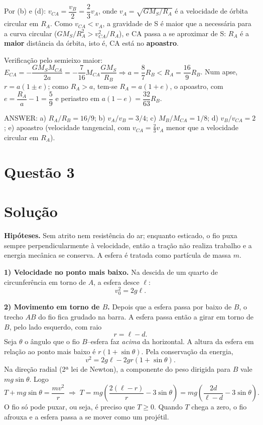 \documentclass{article}%
\begin{document}
Por (b) e (d): $v_{CA}=\dfrac{v_B}{2}=\dfrac{2}{3}v_A$, onde $v_A=\sqrt{GM_S/R_A}$ é a velocidade de órbita circular em $R_A$. Como $v_{CA}<v_A$, a gravidade de S é maior que a necessária para a curva circular ($GM_S/R_A^2>v_{CA}^2/R_A$), e CA passa a se aproximar de S: $R_A$ é a \textbf{maior} distância da órbita, isto é, CA está no \textbf{apoastro}.

Verificação pelo semieixo maior: $E_{CA}=-\dfrac{GM_SM_{CA}}{2a}=-\dfrac{7}{16}M_{CA}\dfrac{GM_S}{R_B}\Rightarrow a=\dfrac{8}{7}R_B<R_A=\dfrac{16}{9}R_B$. Num apse, $r=a(1\pm e)$; como $R_A>a$, tem-se $R_A=a(1+e)$, o apoastro, com $e=\dfrac{R_A}{a}-1=\dfrac{5}{9}$ e periastro em $a(1-e)=\dfrac{32}{63}R_B$.

ANSWER: a) $R_A/R_B=16/9$; b) $v_A/v_B=3/4$; c) $M_B/M_{CA}=1/8$; d) $v_B/v_{CA}=2$; e) apoastro (velocidade tangencial, com $v_{CA}=\tfrac{2}{3}v_A$ menor que a velocidade circular em $R_A$).%
\newpage%
\section*{Questão 3}

\section*{Solução}

\textbf{Hipóteses.} Sem atrito nem resistência do ar; enquanto esticado, o fio puxa sempre perpendicularmente à velocidade, então a tração não realiza trabalho e a energia mecânica se conserva. A esfera é tratada como partícula de massa $m$.

\textbf{1) Velocidade no ponto mais baixo.} Na descida de um quarto de circunferência em torno de $A$, a esfera desce $\ell$:
\[
v_0^2 = 2g\ell .
\]

\textbf{2) Movimento em torno de $B$.} Depois que a esfera passa por baixo de $B$, o trecho $AB$ do fio fica grudado na barra. A esfera passa então a girar em torno de $B$, pelo lado esquerdo, com raio
\[
r=\ell-d .
\]
Seja $\theta$ o ângulo que o fio $B$--esfera faz \emph{acima} da horizontal. A altura da esfera em relação ao ponto mais baixo é $r(1+\sin\theta)$. Pela conservação da energia,
\[
v^2 = 2g\ell - 2gr(1+\sin\theta).
\]
Na direção radial (2ª lei de Newton), a componente do peso dirigida para $B$ vale $mg\sin\theta$. Logo
\[
T + mg\sin\theta = \frac{mv^2}{r}
\;\Longrightarrow\;
T = mg\left(\frac{2(\ell-r)}{r} - 3\sin\theta\right) = mg\left(\frac{2d}{\ell-d} - 3\sin\theta\right).
\]
O fio só pode puxar, ou seja, é preciso que $T\ge 0$. Quando $T$ chega a zero, o fio afrouxa e a esfera passa a se mover como um projétil.
\end{document}
